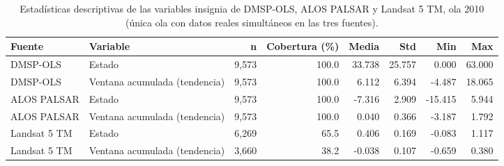\begin{table}
\caption{Estadísticas descriptivas de las variables insignia de DMSP-OLS, ALOS PALSAR y Landsat 5 TM, ola 2010 (única ola con datos reales simultáneos en las tres fuentes).}
\label{tab:geo_descriptivos_2010}
\begin{tabular}{llrrrrrr}
\toprule
Fuente & Variable & n & Cobertura (\%) & Media & Std & Min & Max \\
\midrule
DMSP-OLS & Estado & 9,573 & 100.0 & 33.738 & 25.757 & 0.000 & 63.000 \\
DMSP-OLS & Ventana acumulada (tendencia) & 9,573 & 100.0 & 6.112 & 6.394 & -4.487 & 18.065 \\
ALOS PALSAR & Estado & 9,573 & 100.0 & -7.316 & 2.909 & -15.415 & 5.944 \\
ALOS PALSAR & Ventana acumulada (tendencia) & 9,573 & 100.0 & 0.040 & 0.366 & -3.187 & 1.792 \\
Landsat 5 TM & Estado & 6,269 & 65.5 & 0.406 & 0.169 & -0.083 & 1.117 \\
Landsat 5 TM & Ventana acumulada (tendencia) & 3,660 & 38.2 & -0.038 & 0.107 & -0.659 & 0.380 \\
\bottomrule
\end{tabular}
\end{table}